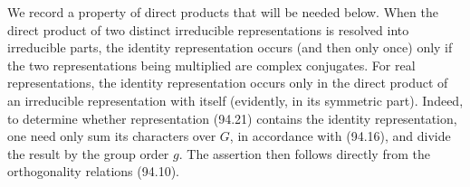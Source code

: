 We record a property of direct products that will be needed below. When the direct product of two distinct irreducible representations is resolved into irreducible parts, the identity representation occurs (and then only once) only if the two representations being multiplied are complex conjugates. For real representations, the identity representation occurs only in the direct product of an irreducible representation with itself (evidently, in its symmetric part). Indeed, to determine whether representation (94.21) contains the identity representation, one need only sum its characters over $G$, in accordance with (94.16), and divide the result by the group order $g$. The assertion then follows directly from the orthogonality relations (94.10).
